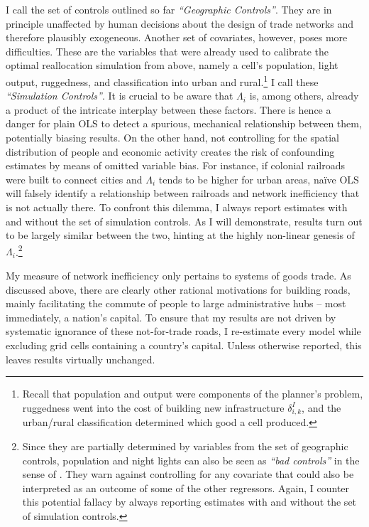 \documentclass[11pt, oneside]{article}   	%
\begin{document}
I call the set of controls outlined so far \emph{``Geographic Controls''}. They are in principle unaffected by human decisions about the design of trade networks and therefore plausibly exogeneous. Another set of covariates, however, poses more difficulties. These are the variables that were already used to calibrate the optimal reallocation simulation from above, namely a cell's population, light output, ruggedness, and classification into urban and rural.\footnote{Recall that population and output were components of the planner's problem, ruggedness went into the cost of building new infrastructure $\delta^{I}_{i,k}$, and the urban/rural classification determined which good a cell produced.} I call these \emph{``Simulation Controls''}. It is crucial to be aware that $\Lambda_{i}$ is, among others, already a product of the intricate interplay between these factors. There is hence a danger for plain OLS to detect a spurious, mechanical relationship between them, potentially biasing results. On the other hand, not controlling for the spatial distribution of people and economic activity creates the risk of confounding estimates by means of omitted variable bias. For instance, if colonial railroads were built to connect cities and $\Lambda_{i}$ tends to be higher for urban areas, naïve OLS will falsely identify a relationship between railroads and network inefficiency that is not actually there. To confront this dilemma, I always report estimates with and without the set of simulation controls. As I will demonstrate, results turn out to be largely similar between the two, hinting at the highly non-linear genesis of $\Lambda_{i}$.\footnote{Since they are partially determined by variables from the set of geographic controls, population and night lights can also be seen as \emph{``bad controls''} in the sense of \cite{Angrist_MostlyHarmlessEconometrics_2008}. They warn against controlling for any covariate that could also be interpreted as an outcome of some of the other regressors. Again, I counter this potential fallacy by always reporting estimates with and without the set of simulation controls.}

My measure of network inefficiency only pertains to systems of goods trade. As discussed above, there are clearly other rational motivations for building roads, mainly facilitating the commute of people to large administrative hubs -- most immediately, a nation's capital. To ensure that my results are not driven by systematic ignorance of these not-for-trade roads, I re-estimate every model while excluding grid cells containing a country's capital. Unless otherwise reported, this leaves results virtually unchanged.
\end{document}
